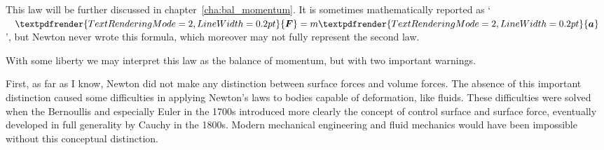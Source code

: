 \documentclass[a4paper,12pt,%
onecolumn,oneside,%
british%
]{memoir}
\renewcommand*{\bm}[1]{\textpdfrender{TextRenderingMode=2,LineWidth=0.2pt}{\boldsymbol{#1}}}
\renewcommand*{\|}[1][]{\nonscript\:#1\vert\nonscript\:\mathopen{}}
\newcommand*{\chap}{chapter}%
\begin{document}
This law will be further discussed in \chap~\ref{cha:bal_momentum}. It is sometimes mathematically reported as \enquote*{$\bm{F} = m \bm{a}$}, but Newton never wrote this formula, which moreover may not fully represent the second law.

With some liberty we may interpret this law as the balance of momentum, but with two important warnings.

First, as far as I know, Newton did not make any distinction between surface forces and volume forces. The absence of this important distinction caused some difficulties in applying Newton's laws to bodies capable of deformation, like fluids. These difficulties were solved when the Bernoullis and especially Euler in the 1700s introduced more clearly the concept of control surface and surface force, eventually developed in full generality by Cauchy in the 1800s. Modern mechanical engineering and fluid mechanics would have been impossible without this conceptual distinction.
%
%
\end{document}
